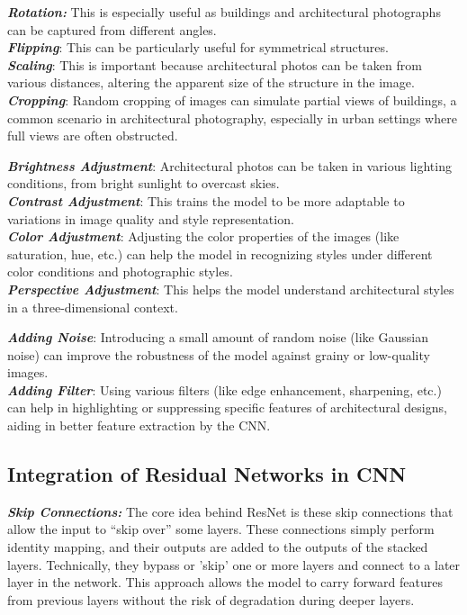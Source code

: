 \documentclass{article}
\begin{document}
\emph{\textbf{Rotation:}} This is especially useful as buildings and architectural photographs can be captured from different angles.\\
\emph{\textbf{Flipping}}: This can be particularly useful for symmetrical structures.\\
\emph{\textbf{Scaling}}: This is important because architectural photos can be taken from various distances, altering the apparent size of the structure in the image.\\
\emph{\textbf{Cropping}}: Random cropping of images can simulate partial views of buildings, a common scenario in architectural photography, especially in urban settings where full views are often obstructed.

\emph{\textbf{Brightness Adjustment}}: Architectural photos can be taken in various lighting conditions, from bright sunlight to overcast skies.\\
\emph{\textbf{Contrast Adjustment}}: This trains the model to be more adaptable to variations in image quality and style representation.\\
\emph{\textbf{Color Adjustment}}: Adjusting the color properties of the images (like saturation, hue, etc.) can help the model in recognizing styles under different color conditions and photographic styles.\\
\emph{\textbf{Perspective Adjustment}}: This helps the model understand architectural styles in a three-dimensional context.

\emph{\textbf{Adding Noise}}: Introducing a small amount of random noise (like Gaussian noise) can improve the robustness of the model against grainy or low-quality images.\\
\emph{\textbf{Adding Filter}}: Using various filters (like edge enhancement, sharpening, etc.) can help in highlighting or suppressing specific features of architectural designs, aiding in better feature extraction by the CNN.

\subsection{Integration of Residual Networks in CNN}
\emph{\textbf{Skip Connections:}} The core idea behind ResNet is these skip connections that allow the input to “skip over” some layers. These connections simply perform identity mapping, and their outputs are added to the outputs of the stacked layers. Technically, they bypass or 'skip' one or more layers and connect to a later layer in the network. This approach allows the model to carry forward features from previous layers without the risk of degradation during deeper layers.
\end{document}
